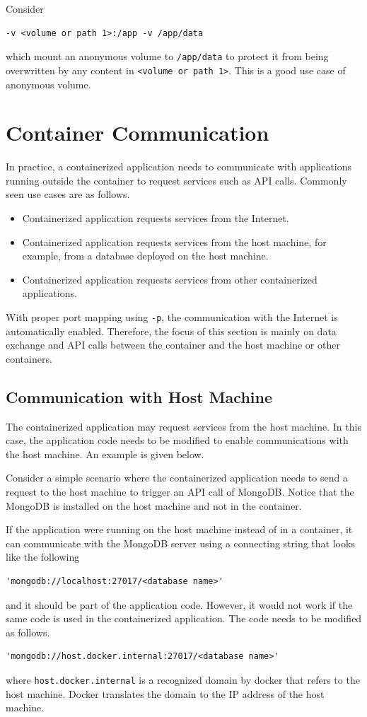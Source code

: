 Consider
\begin{lstlisting}
-v <volume or path 1>:/app -v /app/data
\end{lstlisting} 
which mount an anonymous volume to \verb|/app/data| to protect it from being overwritten by any content in \verb|<volume or path 1>|. This is a good use case of anonymous volume.

\section{Container Communication}

In practice, a containerized application needs to communicate with applications running outside the container to request services such as API calls. Commonly seen use cases are as follows.
\begin{itemize}
	\item Containerized application requests services from the Internet.
	\item Containerized application requests services from the host machine, for example, from a database deployed on the host machine.
	\item Containerized application requests services from other containerized applications.
\end{itemize}

With proper port mapping using \verb|-p|, the communication with the Internet is automatically enabled. Therefore, the focus of this section is mainly on data exchange and API calls between the container and the host machine or other containers.

\subsection{Communication with Host Machine}

The containerized application may request services from the host machine. In this case, the application code needs to be modified to enable communications with the host machine. An example is given below.

Consider a simple scenario where the containerized application needs to send a request to the host machine to trigger an API call of MongoDB. Notice that the MongoDB is installed on the host machine and not in the container.

If the application were running on the host machine instead of in a container, it can communicate with the MongoDB server using a connecting string that looks like the following
\begin{lstlisting}
'mongodb://localhost:27017/<database name>'	
\end{lstlisting}
and it should be part of the application code. However, it would not work if the same code is used in the containerized application. The code needs to be modified as follows.
\begin{lstlisting}
'mongodb://host.docker.internal:27017/<database name>'	
\end{lstlisting}
where \verb|host.docker.internal| is a recognized domain by docker that refers to the host machine. Docker translates the domain to the IP address of the host machine.

